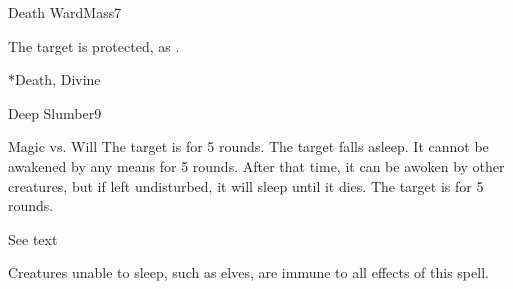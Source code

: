 \begin{spellsection}{Death Ward}{Mass}{7}
\begin{spellheader}
\end{spellheader}
\begin{spellcontent}
    \begin{spelltargetinginfo}
    \end{spelltargetinginfo}
    \begin{spelleffects}
        \spelleffect The target is protected, as .
        \spelldur \durshort
    \end{spelleffects}
\end{spellcontent}
\begin{spellfooter}
    *{Death, Divine}
\end{spellfooter}
\end{spellsection}

\begin{spellsection}{Deep Slumber}{9}
\begin{spellheader}
\end{spellheader}
\begin{spellcontent}
    \begin{spelltargetinginfo}
    \end{spelltargetinginfo}
    \begin{spelleffects}
        \begin{spellattack}{Magic vs. Will}
            \spellsuccess The target is \blinded for 5 rounds.
            \spellcritical The target falls asleep. It cannot be awakened by any means for 5 rounds. After that time, it can be awoken by other creatures, but if left undisturbed, it will sleep until it dies.
            \spellfailure The target is \dazed for 5 rounds.
        \end{spellattack}
        \spelldur See text
    \end{spelleffects}
\end{spellcontent}
\begin{spellfooter}
    \spellnotes Creatures unable to sleep, such as elves, are immune to all effects of this spell.
\end{spellfooter}
\end{spellsection}

